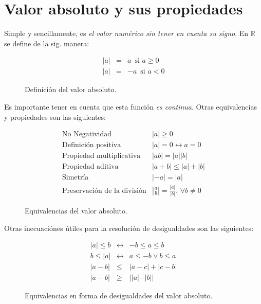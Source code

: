 \documentclass[letterpaper, 12pt]{article}
\begin{document}
        \section{Valor absoluto y sus propiedades}
        Simple y sencillamente, es \emph{el valor numérico sin tener en cuenta su signo}. En \(\mathbb{R}\) se define de la sig. manera:
        \begin{figure}[H]
            \[\begin{matrix}
                |a|&=&a\,\text{ si }a\geq 0\\
                |a|&=&-a\,\text{ si }a<0
            \end{matrix}\]
            \caption{Definición del valor absoluto.}
            \label{fig:abs}
        \end{figure}
        Es importante tener en cuenta que esta función \emph{es continua}. Otras equivalencias y propiedades son las siguientes:
        \begin{figure}[H]
            \[\begin{matrix}
            \text{No Negatividad}&|a|\geq 0\\
            \text{Definición positiva}&|a|=0\leftrightarrow a=0\\
            \text{Propiedad multiplicativa}&|ab|=|a||b|\\
            \text{Propiedad aditiva}&|a+b|\leq|a|+|b|\\
            \text{Simetría}&|-a|=|a|\\
            \text{Preservación de la división}&\left|\frac{a}{b}\right|=\frac{|a|}{|b|},\,\forall b\neq 0
            \end{matrix}\]
            \caption{Equivalencias del valor absoluto.}
            \label{fig:defextraabs}
        \end{figure}
        Otras inecuaciónes útiles para la resolución de desigualdades son las siguientes:
        \begin{figure}[H]
            \[\begin{matrix}
            |a|\leq b&\leftrightarrow&-b\leq a\leq b\\
            b\leq |a|&\leftrightarrow&a\leq-b \vee b\leq a\\
            |a-b|&\leq&|a-c|+|c-b|\\
            |a-b|&\geq&||a|-|b||
            \end{matrix}\]
            \caption{Equivalencias en forma de desigualdades del valor absoluto.}
            \label{fig:eqdesabs}
        \end{figure}
\end{document}
